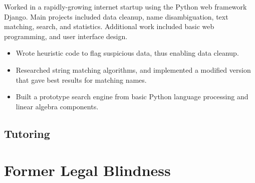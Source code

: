 \documentclass[11pt,a4paper,sans]{moderncv} %
\begin{document}
{Worked in a rapidly-growing internet startup using the Python web framework Django.  Main projects included data cleanup, name disambiguation, text matching, search, and statistics.  Additional work included basic web programming, and user interface design.  
\begin{itemize}
	\item Wrote heuristic code to flag suspicious data, thus enabling data cleanup.
	\item Researched string matching algorithms, and implemented a modified version that gave best results for matching names.
	\item Built a prototype search engine from basic Python language processing and linear algebra components.
\end{itemize}
}


\subsection{Tutoring}

\section{Former Legal Blindness}
\end{document}
